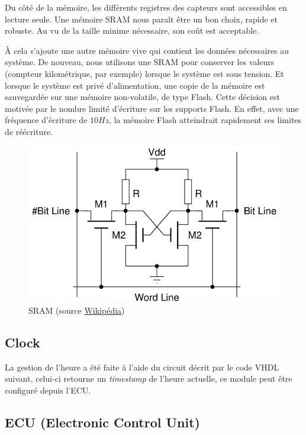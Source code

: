 \documentclass[a4paper,oneside,11pt]{article}  %
\begin{document}
Du côté de la mémoire, les différents registres des capteurs sont accessibles en lecture seule.
Une mémoire SRAM nous paraît être un bon choix, rapide et robuste.
Au vu de la taille minime nécessaire, son coût est acceptable.

À cela s'ajoute une autre mémoire vive qui contient les données nécessaires au système.
De nouveau, nous utilisons une SRAM pour conserver les valeurs (compteur kilométrique, par exemple) lorsque le système est sous tension.
Et lorsque le système est privé d'alimentation, une copie de la mémoire est sauvegardée sur une mémoire non-volatile, de type Flash.
Cette décision est motivée par le nombre limité d'écriture sur les supports Flash.
En effet, avec une fréquence d'écriture de $10 H\!z$, la mémoire Flash atteindrait rapidement ses limites de réécriture.

\begin{figure}[h!]
	\centering
	\includegraphics[scale=0.4]{4T_SRAM_Cell.png}
	\caption{SRAM (source \href{http://en.wikipedia.org/wiki/Static_random-access_memory}{Wikipédia})}
\end{figure}

\subsection{Clock}
La gestion de l'heure a été faite à l'aide du circuit décrit par le code VHDL suivant, celui-ci retourne un \textit{timestamp} de l'heure actuelle, ce module peut être configuré depuis l'ECU.


\subsection{ECU (Electronic Control Unit)}
\end{document}
